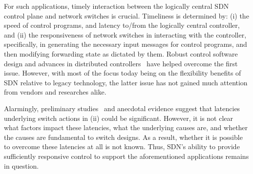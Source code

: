 For such applications, timely interaction between the logically
central SDN control plane and network switches is crucial. Timeliness
is determined by: (i) the speed of control programs, and latency
to/from the logically central controller, and (ii) the responsiveness
of network switches in interacting with the controller, specifically,
in generating the necessary input messages for control programs, and then
modifying forwarding state as dictated by them. Robust
control software design and advances in distributed
controllers~\cite{onix} have helped overcome the first issue. However,
with most of the focus today being on the flexibility benefits of SDN
relative to legacy technology, the latter issue has not gained much
attention from vendors and researches alike.






Alarmingly, preliminary studies~\cite{ucsdpaper,oflops}
and anecdotal evidence suggest that latencies underlying switch
actions in (ii) could be significant. However, it is not clear what
factors impact these latencies, what the underlying causes are, and
whether the causes are fundamental to switch designs. As a
result, whether it is possible to overcome these latencies at all is
not known. Thus, SDN's ability to provide sufficiently
responsive control to support the aforementioned applications remains
in question.

